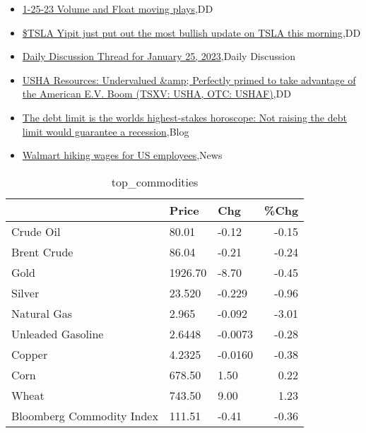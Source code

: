 \documentclass{article}%
\begin{document}
%
\begin{itemize}%
\item%
\href{https://reddit.com/r/wallstreetbets/comments/10kxsf2/12523\_volume\_and\_float\_moving\_plays/}{1-25-23 Volume and Float moving plays},DD%
\item%
\href{https://reddit.com/r/wallstreetbets/comments/10kxg9o/tsla\_yipit\_just\_put\_out\_the\_most\_bullish\_update/}{\$TSLA Yipit just put out the most bullish update on TSLA this morning},DD%
\item%
\href{https://reddit.com/r/wallstreetbets/comments/10kw2qh/daily\_discussion\_thread\_for\_january\_25\_2023/}{Daily Discussion Thread for January 25, 2023},Daily Discussion%
\item%
\href{https://reddit.com/r/Baystreetbets/comments/10kxgvz/usha\_resources\_undervalued\_perfectly\_primed\_to/}{USHA Resources: Undervalued \&amp; Perfectly primed to take advantage of the American E.V. Boom (TSXV: USHA, OTC: USHAF)},DD%
\item%
\href{https://reddit.com/r/Economics/comments/10khyht/the\_debt\_limit\_is\_the\_worlds\_higheststakes/}{The debt limit is the worlds highest-stakes horoscope: Not raising the debt limit would guarantee a recession},Blog%
\item%
\href{https://reddit.com/r/Economics/comments/10khjat/walmart\_hiking\_wages\_for\_us\_employees/}{Walmart hiking wages for US employees},News%
\end{itemize}%


\begin{table}[htbp]%
\caption{top\_commodities}%
\centering%
\begin{adjustbox}{width=1\textwidth}%
\begin{tabular}{lllr}
\toprule
                          &   Price &     Chg &  \%Chg \\
\midrule
               Crude Oil  &   80.01 &   -0.12 & -0.15 \\
             Brent Crude  &   86.04 &   -0.21 & -0.24 \\
                    Gold  & 1926.70 &   -8.70 & -0.45 \\
                  Silver  &  23.520 &  -0.229 & -0.96 \\
             Natural Gas  &   2.965 &  -0.092 & -3.01 \\
       Unleaded Gasoline  &  2.6448 & -0.0073 & -0.28 \\
                  Copper  &  4.2325 & -0.0160 & -0.38 \\
                    Corn  &  678.50 &    1.50 &  0.22 \\
                   Wheat  &  743.50 &    9.00 &  1.23 \\
Bloomberg Commodity Index &  111.51 &   -0.41 & -0.36 \\
\bottomrule
\end{tabular}
%
\end{adjustbox}%
\end{table}
\end{document}

